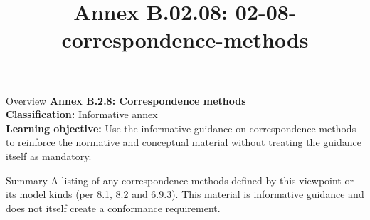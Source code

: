 \documentclass[10pt,letterpaper]{article}
\title{Annex B.02.08: 02-08-correspondence-methods}
\author{}
\date{}
\begin{document}
\maketitle
\begin{CornellOverviewBox}{Overview}
{\Large\bfseries\textcolor{CNavy}{Annex B.2.8: Correspondence methods}}\\[3pt]
{\small\textbf{Classification:} Informative annex}\\
{\small\textbf{Learning objective:} Use the informative guidance on correspondence methods to reinforce the normative and conceptual material without treating the guidance itself as mandatory.}
\end{CornellOverviewBox}
\vspace{3pt}

\begin{CornellNotesTable}
\end{CornellNotesTable}


\begin{CornellSummaryBox}{Summary}
A listing of any correspondence methods defined by this viewpoint or its model kinds (per 8.1, 8.2 and 6.9.3). This material is informative guidance and does not itself create a conformance requirement.
\end{CornellSummaryBox}
\end{document}
